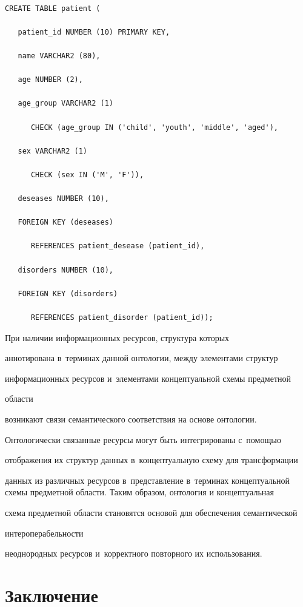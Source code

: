       \begin{verbatim}

CREATE TABLE patient (

   patient_id NUMBER (10) PRIMARY KEY,

   name VARCHAR2 (80),

   age NUMBER (2),

   age_group VARCHAR2 (1)

      CHECK (age_group IN ('child', 'youth', 'middle', 'aged'),

   sex VARCHAR2 (1)

      CHECK (sex IN ('M', 'F')),

   deseases NUMBER (10),

   FOREIGN KEY (deseases)

      REFERENCES patient_desease (patient_id),

   disorders NUMBER (10),

   FOREIGN KEY (disorders)

      REFERENCES patient_disorder (patient_id));

      \end{verbatim}

      

      При наличии информационных ресурсов, структура которых 

аннотирована в~терминах данной онтологии, между элементами структур 

информационных ресурсов и~элементами концептуальной схемы предметной 

области 

возникают связи семантического соответствия на основе онтологии. 

Онтологически связанные ресурсы могут быть интегрированы с~помощью 

отображения их структур данных в~концептуальную схему для трансформации 

данных из различных ресурсов в~представление в~терминах концептуальной схемы предметной области. Таким образом, онтология и концептуальная 

схема предметной области становятся основой для обеспечения семантической 

интероперабельности 

неоднородных ресурсов и~корректного повторного их использования.



\section{Заключение}


